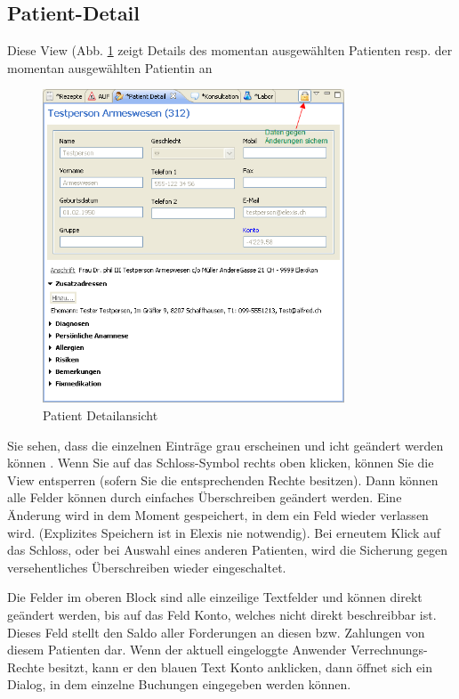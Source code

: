 \subsection{Patient-Detail}
Diese View (Abb. \ref{fig:patdetail} zeigt Details des momentan ausgewählten
Patienten resp. der momentan ausgewählten Patientin an

\begin{figure}[t]
\centering
  \includegraphics[width=0.8\textwidth]{images/patdetail}
  \caption{Patient Detailansicht}
  \label{fig:patdetail}
  \hfill

\end{figure}

Sie sehen, dass die einzelnen Einträge grau erscheinen und icht geändert werden können . Wenn Sie auf das Schloss-Symbol rechts oben klicken, können Sie die View entsperren (sofern Sie die entsprechenden Rechte besitzen). Dann können
alle Felder können durch einfaches Überschreiben geändert werden. Eine
Änderung wird in dem Moment gespeichert, in dem ein Feld wieder verlassen wird.
(Explizites Speichern ist in Elexis nie notwendig). Bei erneutem Klick auf das Schloss, oder bei Auswahl eines anderen Patienten, wird die Sicherung gegen versehentliches Überschreiben wieder eingeschaltet.

\medskip

Die Felder im oberen Block sind alle einzeilige Textfelder und können direkt geändert
werden, bis auf das Feld \glqq Konto\grqq{}, welches nicht direkt beschreibbar
ist. Dieses Feld stellt den Saldo aller Forderungen an diesen bzw. Zahlungen von
diesem Patienten dar. Wenn der aktuell eingeloggte Anwender Verrechnungs-Rechte
besitzt, kann er den blauen Text \glqq Konto\grqq{} anklicken, dann öffnet sich
ein Dialog, in dem einzelne Buchungen eingegeben werden können.


